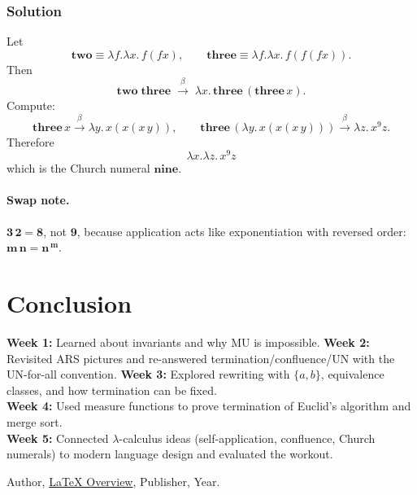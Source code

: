\documentclass{article}
\theoremstyle{theorem}
\theoremstyle{definition}
\theoremstyle{remark}
\begin{document}
\subsubsection*{Solution}
Let
\[
\mathbf{two} \equiv \lambda f.\lambda x.\,f(fx),\qquad
\mathbf{three} \equiv \lambda f.\lambda x.\,f(f(fx)).
\]
Then
\[
\mathbf{two}\;\mathbf{three}
\;\xrightarrow{\beta}\;
\lambda x.\,\mathbf{three}\,(\mathbf{three}\,x).
\]
Compute:
\[
\mathbf{three}\,x \xrightarrow{\beta} \lambda y.\,x(x(x\,y)),
\qquad
\mathbf{three}\,(\lambda y.\,x(x(x\,y))) \xrightarrow{\beta} \lambda z.\,x^{9}z.
\]
Therefore
\[
\boxed{\lambda x.\lambda z.\,x^{9}z}
\]
which is the Church numeral $\mathbf{nine}$.

\paragraph{Swap note.}
$\mathbf{3}\,\mathbf{2}=\mathbf{8}$, not $\mathbf{9}$, because application acts like exponentiation with reversed order: $\mathbf{m}\,\mathbf{n}=\mathbf{n}^{\,\mathbf{m}}$.

\section{Conclusion}
\textbf{Week 1:} Learned about invariants and why MU is impossible.  
\textbf{Week 2:} Revisited ARS pictures and re-answered termination/confluence/UN with the UN-for-all convention.  
\textbf{Week 3:} Explored rewriting with $\{a,b\}$, equivalence classes, and how termination can be fixed.\\
\textbf{Week 4:} Used measure functions to prove termination of Euclid's algorithm and merge sort.\\
\textbf{Week 5:} Connected $\lambda$-calculus ideas (self-application, confluence, Church numerals) to modern language design and evaluated the workout.

\begin{thebibliography}{99}
 Author, \href{https://en.wikipedia.org/wiki/LaTeX}{LaTeX Overview}, Publisher, Year.
\end{thebibliography}
\end{document}
